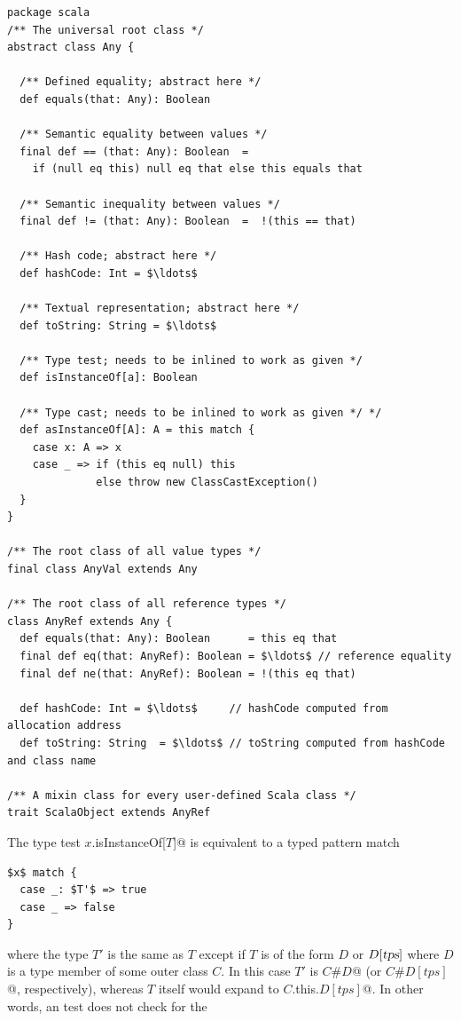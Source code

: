 \begin{lstlisting}
package scala 
/** The universal root class */
abstract class Any {

  /** Defined equality; abstract here */
  def equals(that: Any): Boolean 

  /** Semantic equality between values */
  final def == (that: Any): Boolean  =  
    if (null eq this) null eq that else this equals that

  /** Semantic inequality between values */
  final def != (that: Any): Boolean  =  !(this == that)

  /** Hash code; abstract here */
  def hashCode: Int = $\ldots$

  /** Textual representation; abstract here */
  def toString: String = $\ldots$

  /** Type test; needs to be inlined to work as given */
  def isInstanceOf[a]: Boolean

  /** Type cast; needs to be inlined to work as given */ */
  def asInstanceOf[A]: A = this match {
    case x: A => x
    case _ => if (this eq null) this
              else throw new ClassCastException()
  }
}

/** The root class of all value types */
final class AnyVal extends Any 

/** The root class of all reference types */
class AnyRef extends Any {
  def equals(that: Any): Boolean      = this eq that 
  final def eq(that: AnyRef): Boolean = $\ldots$ // reference equality
  final def ne(that: AnyRef): Boolean = !(this eq that)

  def hashCode: Int = $\ldots$     // hashCode computed from allocation address
  def toString: String  = $\ldots$ // toString computed from hashCode and class name

/** A mixin class for every user-defined Scala class */
trait ScalaObject extends AnyRef 
\end{lstlisting}

The type test \lstinline@$x$.isInstanceOf[$T$]@ is equivalent to a typed
pattern match
\begin{lstlisting} 
$x$ match {
  case _: $T'$ => true
  case _ => false
}
\end{lstlisting} 
where the type $T'$ is the same as $T$ except if $T$ is
of the form $D$ or $D[\mbox{\sl tps}]$ where $D$ is a type member of some outer
class $C$. In this case $T'$ is \lstinline@$C$#$D$@ (or
\lstinline@$C$#$D[tps]$@, respectively), whereas $T$ itself would
expand to \lstinline@$C$.this.$D[tps]$@. In other words, an
\lstinline@isInstanceOf@ test does not check for the   


